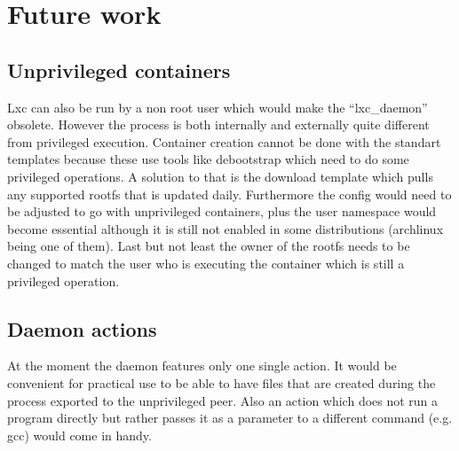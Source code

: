 \chapter{Future work}

\section{Unprivileged containers}

Lxc can also be run by a non root user which would make the ``lxc\_daemon'' obsolete.
However the process is both internally and externally quite different from privileged execution.
Container creation cannot be done with the standart templates because these use tools like
debootstrap which need to do some privileged operations. A solution to that is the download template
which pulls any supported rootfs that is updated daily. Furthermore the config would need to
be adjusted to go with unprivileged containers, plus the user namespace would become essential
although it is still not enabled in some distributions (archlinux being one of them).
Last but not least the owner of the rootfs needs to be changed to match the user who is executing
the container which is still a privileged operation.

\section{Daemon actions}

At the moment the daemon features only one single action. It would be convenient for practical use
to be able to have files that are created during the process exported to the unprivileged peer.
Also an action which does not run a program directly but rather passes it as a parameter to a different
command (e.g. gcc) would come in handy.